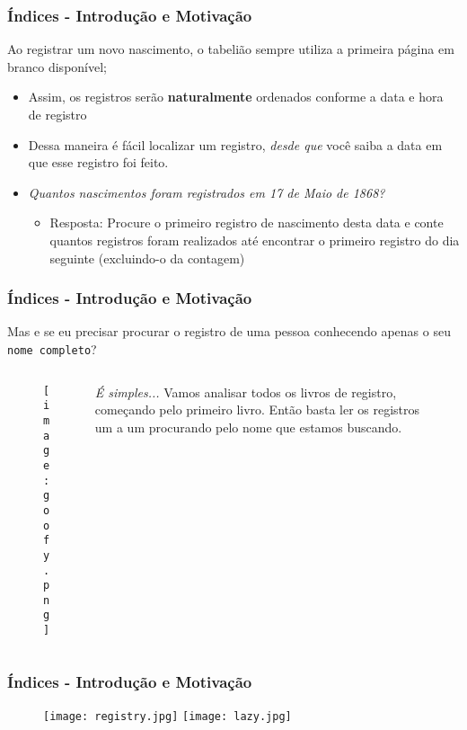 \documentclass[t, 10pt, aspectratio=169, table, x11names]{beamer}
\begin{document}
	\begin{frame}
		\frametitle{Índices - Introdução e Motivação}
			Ao registrar um novo nascimento, o tabelião sempre utiliza a primeira página em branco disponível;
		\reasonboxend
		\begin{itemize}
			\item Assim, os registros serão \textbf{naturalmente} ordenados conforme a data e hora de registro
			\bigskip
			\item Dessa maneira é fácil localizar um registro, \textit{desde que} você saiba a data em que esse registro foi feito.
			\bigskip
			\item \textit{Quantos nascimentos foram registrados em 17 de Maio de 1868?}
			\bigskip
			\begin{itemize}
				\small
				\item Resposta: Procure o primeiro registro de nascimento desta data e conte quantos registros foram realizados até encontrar o primeiro registro do dia seguinte (excluindo-o da contagem)
			\end{itemize}
		\end{itemize}
	\end{frame}

	\begin{frame}
		\frametitle{Índices - Introdução e Motivação}
		Mas e se eu precisar procurar o registro de uma pessoa conhecendo apenas o seu \texttt{nome completo}?
		\bigskip
		\begin{columns}[t]
			\begin{column}{0.40\textwidth}
				\begin{figure}[h]
					\texttt{[image: goofy.png]}
				\end{figure}
			\end{column}
			\begin{column}{0.50\textwidth}
				\bigskip
				
				\textit{É simples...} Vamos analisar todos os livros de registro, começando pelo primeiro livro. Então basta ler os registros um a um procurando pelo nome que estamos buscando.
			\end{column}
			\begin{column}{0.05\textwidth}
			\end{column}
		\end{columns}
	\end{frame}

	\begin{frame}
		\frametitle{Índices - Introdução e Motivação}
		\bigskip
		\begin{figure}[h]
			\centering
			\texttt{[image: registry.jpg]}
			\texttt{[image: lazy.jpg]}
		\end{figure}
	\end{frame}
\end{document}
